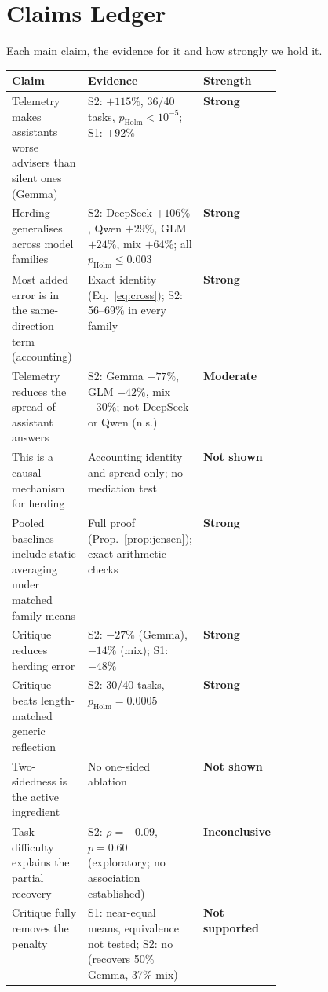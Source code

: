 \documentclass[10pt]{article}
\theoremstyle{manuscript}\newtheorem{proposition}{Proposition}
\newcommand{\pH}{p_{\text{Holm}}}
\newcommand{\strongc}{\textcolor{good}{\textbf{Strong}}}
\newcommand{\moderate}{\textcolor{mid}{\textbf{Moderate}}}
\newcommand{\weakc}{\textcolor{weak}{\textbf{Not shown}}}
\newcommand{\inconc}{\textcolor{mid}{\textbf{Inconclusive}}}
\newcommand{\notsup}{\textcolor{weak}{\textbf{Not supported}}}
\begin{document}
\FloatBarrier
\clearpage\section{Claims Ledger}\label{sec:cruxes}
Each main claim, the evidence for it and how strongly we hold it.

\begin{tcolorbox}[enhanced,colback=gray!4,colframe=gray!50,boxrule=0.5pt,arc=1pt,left=6pt,right=6pt,top=4pt,bottom=4pt,title={\small\textbf{Claims ledger}},coltitle=black,colbacktitle=gray!15,fonttitle=\small]
\small
\begin{tabularx}{\linewidth}{@{}>{\raggedright\arraybackslash}p{0.40\linewidth}>{\raggedright\arraybackslash}Xl@{}}
\textbf{Claim} & \textbf{Evidence} & \textbf{Strength}\\\midrule
Telemetry makes assistants worse advisers than silent ones (Gemma) & S2: $+115\%$, 36/40 tasks, $\pH<10^{-5}$; S1: $+92\%$ & \strongc\\
Herding generalises across model families & S2: DeepSeek $+106\%$, Qwen $+29\%$, GLM $+24\%$, mix $+64\%$; all $\pH\le0.003$ & \strongc\\
Most added error is in the same-direction term (accounting) & Exact identity (Eq.~\ref{eq:cross}); S2: 56--69\% in every family & \strongc\\
Telemetry reduces the spread of assistant answers & S2: Gemma $-77\%$, GLM $-42\%$, mix $-30\%$; not DeepSeek or Qwen (n.s.) & \moderate\\
This is a causal mechanism for herding & Accounting identity and spread only; no mediation test & \weakc\\
Pooled baselines include static averaging under matched family means & Full proof (Prop.~\ref{prop:jensen}); exact arithmetic checks & \strongc\\
Critique reduces herding error & S2: $-27\%$ (Gemma), $-14\%$ (mix); S1: $-48\%$ & \strongc\\
Critique beats length-matched generic reflection & S2: 30/40 tasks, $\pH=0.0005$ & \strongc\\
Two-sidedness is the active ingredient & No one-sided ablation & \weakc\\
Task difficulty explains the partial recovery & S2: $\rho=-0.09$, $p=0.60$ (exploratory; no association established) & \inconc\\
Critique fully removes the penalty & S1: near-equal means, equivalence not tested; S2: no (recovers 50\% Gemma, 37\% mix) & \notsup\\

\end{tabularx}
\end{tcolorbox}
\end{document}
